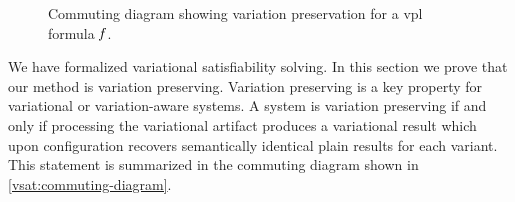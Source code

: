 \label{section:vsat:variation-preservation}
%
\begin{figure}[h]
  \centering
  
  \caption{Commuting diagram showing variation preservation for a \ac{vpl}
    formula $\mathit{f}$.}%
  \label{vsat:commuting-diagram}
\end{figure}
We have formalized variational satisfiability solving. In this section we prove
that our method is variation preserving. Variation preserving is a key property
for variational or variation-aware systems. A system is variation preserving if
and only if processing the variational artifact produces a variational result
which upon configuration recovers semantically identical plain results for each
variant. This statement is summarized in the commuting diagram shown in
\autoref{vsat:commuting-diagram}.
